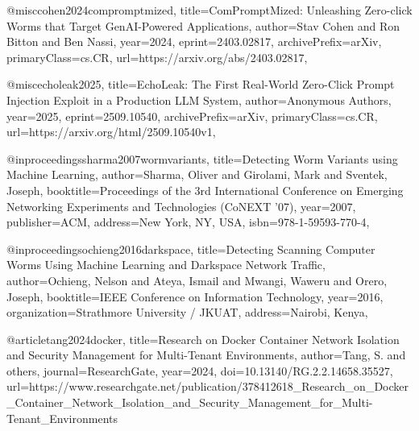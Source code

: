 @misc{cohen2024compromptmized,
      title={ComPromptMized: Unleashing Zero-click Worms that Target GenAI-Powered Applications}, 
      author={Stav Cohen and Ron Bitton and Ben Nassi},
      year={2024},
      eprint={2403.02817},
      archivePrefix={arXiv},
      primaryClass={cs.CR},
      url={https://arxiv.org/abs/2403.02817},
}

@misc{echoleak2025,
      title={EchoLeak: The First Real-World Zero-Click Prompt Injection Exploit in a Production LLM System}, 
      author={Anonymous Authors}, %
      year={2025},
      eprint={2509.10540},
      archivePrefix={arXiv},
      primaryClass={cs.CR},
      url={https://arxiv.org/html/2509.10540v1},
}

@inproceedings{sharma2007wormvariants,
      title={Detecting Worm Variants using Machine Learning},
      author={Sharma, Oliver and Girolami, Mark and Sventek, Joseph},
      booktitle={Proceedings of the 3rd International Conference on Emerging Networking Experiments and Technologies (CoNEXT '07)},
      year={2007},
      publisher={ACM},
      address={New York, NY, USA},
      isbn={978-1-59593-770-4},
}

@inproceedings{ochieng2016darkspace,
      title={Detecting Scanning Computer Worms Using Machine Learning and Darkspace Network Traffic},
      author={Ochieng, Nelson and Ateya, Ismail and Mwangi, Waweru and Orero, Joseph},
      booktitle={IEEE Conference on Information Technology},
      year={2016},
      organization={Strathmore University / JKUAT},
      address={Nairobi, Kenya},
}

@article{tang2024docker,
      title={Research on Docker Container Network Isolation and Security Management for Multi-Tenant Environments},
      author={Tang, S. and others}, %
      journal={ResearchGate},
      year={2024},
      doi={10.13140/RG.2.2.14658.35527},
      url={https://www.researchgate.net/publication/378412618_Research_on_Docker_Container_Network_Isolation_and_Security_Management_for_Multi-Tenant_Environments}
}